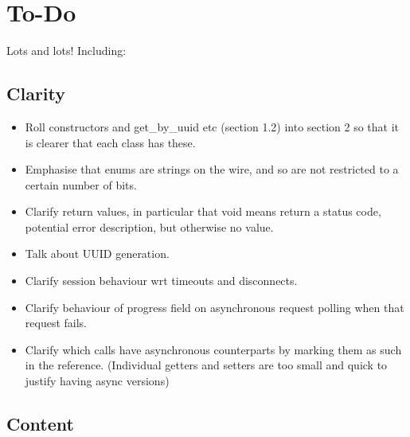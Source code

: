 %
%
%
%

\section{To-Do}

Lots and lots! Including:

\subsection{Clarity}

\begin{itemize}

\item Roll constructors and get\_by\_uuid etc (section 1.2) into section 2 so
that it is clearer that each class has these.

\item Emphasise that enums are strings on the wire, and so are not restricted
to a certain number of bits.

\item Clarify return values, in particular that void means return a status
code, potential error description, but otherwise no value.

\item Talk about UUID generation.

\item Clarify session behaviour wrt timeouts and disconnects.

\item Clarify behaviour of progress field on asynchronous request polling when
that request fails.

\item Clarify which calls have asynchronous counterparts by marking them as such in the reference. (Individual getters and setters are too small and quick to justify having async versions)

\end{itemize}

\subsection{Content}

